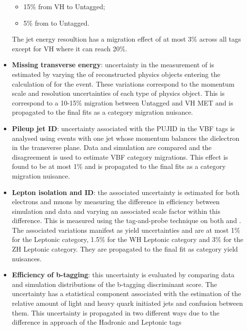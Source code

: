 \begin{itemize}[noitemsep]
{\begin{itemize}[noitemsep]
               \item[\textbullet] 15\% from VH to Untagged;
               \item[\textbullet] 5\% from \ttH to Untagged.
           \end{itemize}
           The jet energy resoultion has a migration effect of at most 3\% across all tags except for VH where it can reach 20\%.
           }
    \item {\textbf{Missing transverse energy}: 
           uncertainty in the measurement of \MET is estimated by varying the \pt of reconstructed physics objects entering the calculation of \MET for the event. 
           These variations correspond to the momentum scale and resolution uncertainties of each type of physics object. 
           This is correspond to a 10-15\% migration between Untagged and VH MET and is propagated to the final fits as a category migration nuisance.
           }
    \item {\textbf{Pileup jet ID}: 
           uncertainty associated with the PUJID in the VBF tags is analysed using \Zee events with one jet whose momentum balances the dielectron in the transverse plane.            
           Data and simulation are compared and the disagreement is used to estimate VBF category migrations. This effect is found to be at most 1\% and is propagated to the final fits as a category migration nuisance. 
           }
    \item {\textbf{Lepton isolation and ID}: 
           the associated uncertainty is estimated for both electrons and muons by measuring the difference in efficiency between simulation and data and varying an associated scale factor within this difference. 
           This is measured using the tag-and-probe technique on both \Zee and \Zmumu.
           The associated variations manifest as yield uncertainties and are at most 1\% for the \ttH Leptonic category, 1.5\% for the WH Leptonic category and 3\% for the ZH Leptonic category. They are propagated to the final fit as category yield nuisances. 
           }
    \item {\textbf{Efficiency of b-tagging}: 
           this uncertainty is evaluated by comparing data and simulation distributions of the b-tagging discriminant score. The uncertainty has a statistical component associated with the estimation of the relative amount of light and heavy quark initiated jets and confusion between them. 
           This uncertainty is propagated in two different ways due to the difference in approach of the \ttH Hadronic and \ttH Leptonic tags
}
\end{itemize}
